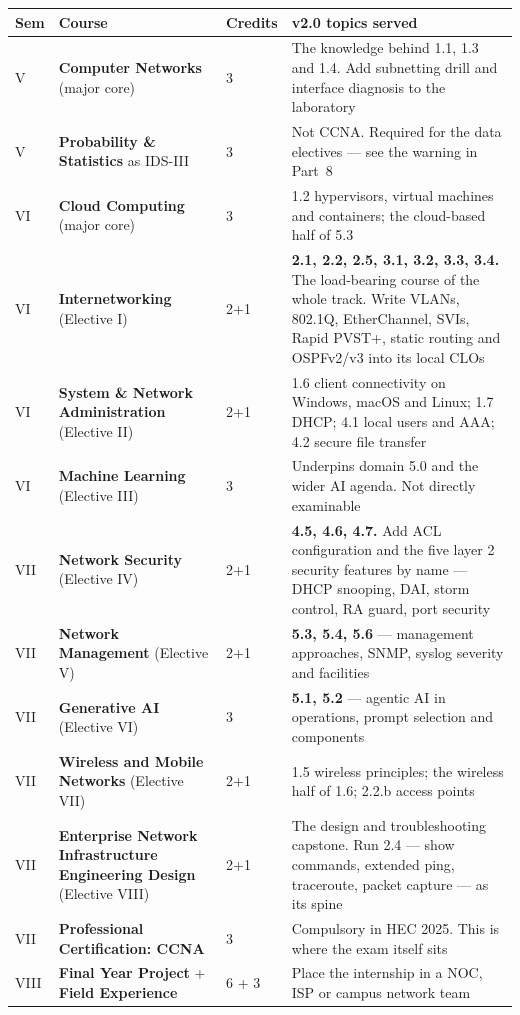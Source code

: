 \documentclass[11pt,a4paper,oneside]{report}
\begin{document}
\begin{longtable}{@{}L{1.5cm}L{5.9cm}L{2.0cm}L{5.7cm}@{}}
\toprule
{}
\textbf{Sem} & \textbf{Course} & \textbf{Credits} & \textbf{v2.0 topics served} \\
\midrule
\endhead
V & \textbf{Computer Networks} (major core) & 3 &
The knowledge behind 1.1, 1.3 and 1.4. Add subnetting drill and interface
diagnosis to the laboratory \\
V & \textbf{Probability \& Statistics} as IDS-III & 3 &
Not CCNA. Required for the data electives --- see the warning in Part~8 \\
VI & \textbf{Cloud Computing} (major core) & 3 &
1.2 hypervisors, virtual machines and containers; the cloud-based half of 5.3 \\
VI & \textbf{Internetworking} (Elective I) & 2+1 &
\textbf{2.1, 2.2, 2.5, 3.1, 3.2, 3.3, 3.4.} The load-bearing course of the whole
track. Write VLANs, 802.1Q, EtherChannel, SVIs, Rapid PVST+, static routing and
OSPFv2/v3 into its local CLOs \\
VI & \textbf{System \& Network Administration} (Elective II) & 2+1 &
1.6 client connectivity on Windows, macOS and Linux; 1.7 DHCP; 4.1 local users
and AAA; 4.2 secure file transfer \\
VI & \textbf{Machine Learning} (Elective III) & 3 &
Underpins domain 5.0 and the wider AI agenda. Not directly examinable \\
VII & \textbf{Network Security} (Elective IV) & 2+1 &
\textbf{4.5, 4.6, 4.7.} Add ACL configuration and the five layer 2 security
features by name --- DHCP snooping, DAI, storm control, RA guard, port security \\
VII & \textbf{Network Management} (Elective V) & 2+1 &
\textbf{5.3, 5.4, 5.6} --- management approaches, SNMP, syslog severity and
facilities \\
VII & \textbf{Generative AI} (Elective VI) & 3 &
\textbf{5.1, 5.2} --- agentic AI in operations, prompt selection and components \\
VII & \textbf{Wireless and Mobile Networks} (Elective VII) & 2+1 &
1.5 wireless principles; the wireless half of 1.6; 2.2.b access points \\
VII & \textbf{Enterprise Network Infrastructure Engineering Design} (Elective VIII) & 2+1 &
The design and troubleshooting capstone. Run 2.4 --- show commands, extended
ping, traceroute, packet capture --- as its spine \\
VII & \textbf{Professional Certification: CCNA} & 3 &
Compulsory in HEC 2025. This is where the exam itself sits \\
VIII & \textbf{Final Year Project} + \textbf{Field Experience} & 6 + 3 &
Place the internship in a NOC, ISP or campus network team \\
\bottomrule
\end{longtable}
\end{document}
